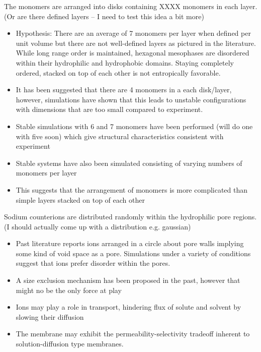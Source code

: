 \documentclass{article}
\begin{document}
	The monomers are arranged into disks containing XXXX monomers in each layer. (Or are there defined layers -- I need to test this idea a bit more) 
	\begin{itemize}
		\item Hypothesis: There are an average of 7 monomers per layer when defined per unit volume but there are not well-defined layers as pictured in the literature. While long range order is maintained, hexagonal mesophases are disordered within their hydrophilic and hydrophobic domains. Staying completely ordered, stacked on top of each other is not entropically favorable.
	        \item It has been suggested that there are 4 monomers in a each disk/layer, however, simulations have shown that this leads to unstable configurations with dimensions that are too small compared to experiment.
                \item Stable simulations with 6 and 7 monomers have been performed (will do one with five soon) which give structural characteristics consistent with experiment
                \item Stable systems have also been simulated consisting of varying numbers of monomers per layer
                \item This suggests that the arrangement of monomers is more complicated than simple layers stacked on top of each other
	\end{itemize}
	Sodium counterions are distributed randomly within the hydrophilic pore regions. (I should actually come up with a distribution e.g. gaussian) 
	\begin{itemize}
		\item Past literature reports ions arranged in a circle about pore walls implying some kind of void space as a pore. Simulations under a variety of conditions suggest that ions prefer disorder within the pores. 
		\item A size exclusion mechanism has been proposed in the past, however that might no be the only force at play
		\item Ions may play a role in transport, hindering flux of solute and solvent by slowing their diffusion
		\item The membrane may exhibit the permeability-selectivity tradeoff inherent to solution-diffusion type membranes. 
        \end{itemize}	
\end{document}
